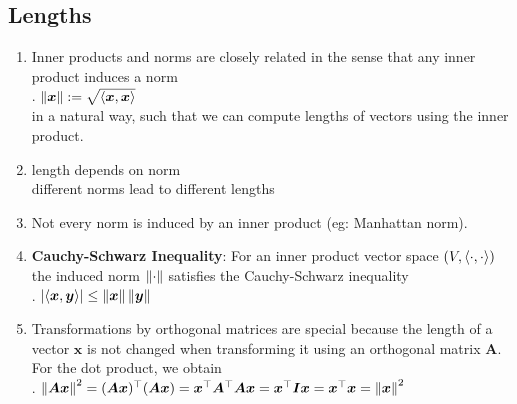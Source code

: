 \subsection{Lengths}

\begin{enumerate}
    \item Inner products and norms are closely related in the sense that any inner product induces a norm
    \hfill \cite{mfml/book/mml/Deisenroth-Faisal-Ong}
    \\
    .\hfill
    $\left\| \bm{x} \right\| := \sqrt{\langle\bm{x}, \bm{x}\rangle}$
    \hfill \cite{mfml/book/mml/Deisenroth-Faisal-Ong}
    \\
    in a natural way, such that we can compute lengths of vectors using the inner product.
    \hfill \cite{mfml/book/mml/Deisenroth-Faisal-Ong}

    \item length depends on norm
    \hfill \cite{common/online/chatgpt}
    \\
    different norms lead to different lengths
    \hfill \cite{common/online/chatgpt}

    \item Not every norm is induced by an inner product (eg: Manhattan norm).
    \hfill \cite{mfml/book/mml/Deisenroth-Faisal-Ong}

    \item \textbf{Cauchy-Schwarz Inequality}: For an inner product vector space $(V,\langle\cdot, \cdot\rangle)$ the induced norm $\left\| \cdot \right\|$ satisfies the Cauchy-Schwarz inequality
    \hfill \cite{mfml/book/mml/Deisenroth-Faisal-Ong}
    \\
    .\hfill
    $\left| \langle\bm{x}, \bm{y}\rangle \right| \leq \left\| \bm{x} \right\| \left\| \bm{y} \right\|$
    \hfill \cite{mfml/book/mml/Deisenroth-Faisal-Ong}

    \item Transformations by orthogonal matrices are special because the length of a vector $\bm{x}$ is not changed when transforming it using an orthogonal matrix $\bm{A}$. 
    For the dot product, we obtain
    \hfill \cite{mfml/book/mml/Deisenroth-Faisal-Ong}
    \\
    .\hfill
    $
        \left\| \bm{Ax} \right\|^2 
        = (\bm{Ax})^\top (\bm{Ax})
        = \bm{x}^\top \bm{A}^\top \bm{Ax}
        = \bm{x}^\top \bm{Ix}
        = \bm{x}^\top \bm{x}
        = \left\| \bm{x} \right\|^2
    $
    \hfill \cite{mfml/book/mml/Deisenroth-Faisal-Ong}
\end{enumerate}





